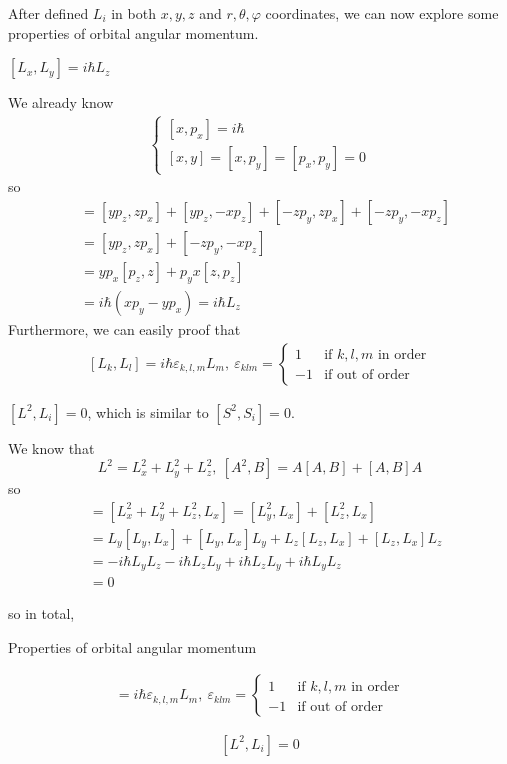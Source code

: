 \documentclass[UTF8,12pt]{article} %
\makeatletter
\newenvironment{proof}[1][\protect\proofname]{\par
\normalfont\topsep6\p@\@plus6\p@\relax
\trivlist
\itemindent\parindent
\item[\hskip\labelsep
\scshape
#1]\ignorespaces
}{%
\endtrivlist\@endpefalse
}
\renewcommand{\proofname}{\it{Solution}}
\makeatother
\begin{document}
After defined $L_{i}$ in both $x,y,z$ and $r,\theta, \varphi$ coordinates, we can now explore some properties of orbital angular momentum.
\begin{enumerate*}
\item $[L_{x}, L_{y}] = i\hbar L_{z}$
\begin{proof}[Proof]
We already know
\begin{align}
\begin{cases}
[x, p_{x}] = i\hbar \\
[x,y] = [x,p_{y}] = [p_{x}, p_{y}] = 0
\end{cases}
\end{align}
so
\begin{align}
[yp_{z} - zp_{y}, zp_{x} - xp_{z}] &= [yp_{z}, zp_{x}] + [yp_{z}, -xp_{z}] + [-zp_{y}, zp_{x}] + [-zp_{y}, -xp_{z}] \\
&= [yp_{z}, zp_{x}] + [-zp_{y}, -xp_{z}] \\
&= yp_{x}[p_{z},z] + p_{y}x[z,p_{z}] \\
&= i\hbar\left(xp_{y} - yp_{x}\right) = i\hbar L_{z}
\end{align}
\end{proof}
Furthermore, we can easily proof that 
\begin{align}
\boxed{[L_{k}, L_{l}] = i\hbar\varepsilon_{k,l,m}L_{m},~ \varepsilon_{klm} = \begin{cases}1&\text{if }k,l,m\text{ in order}\\-1&\text{if out of order}\end{cases}}
\end{align}
\item $\boxed{[L^{2}, L_{i}] = 0}$, which is similar to $[S^{2}, S_{i}] = 0$.
\begin{proof}[Proof]
We know that
$$L^{2} = L_{x}^{2} + L_{y}^{2} + L_{z}^{2},~ [A^{2},B] = A[A,B] + [A,B]A$$
so
\begin{align}
[L^{2}, L_{x}] &= [L_{x}^{2} + L_{y}^{2} + L_{z}^{2}, L_{x}] = [L_{y}^{2}, L_{x}] + [L_{z}^{2}, L_{x}] \\
&= L_{y}[L_{y}, L_{x}] + [L_{y}, L_{x}]L_{y} + L_{z}[L_{z}, L_{x}] + [L_{z}, L_{x}]L_{z} \\
&= -i\hbar L_{y}L_{z} -i\hbar L_{z}L_{y} + i\hbar L_{z}L_{y} + i\hbar L_{y}L_{z} \\
&= 0
\end{align}
\end{proof}
\end{enumerate*}
so in total,
\begin{myboxes}{Properties of orbital angular momentum}{}
\begin{enumerate*}
\item \begin{align*}
[L_{k}, L_{l}] = i\hbar\varepsilon_{k,l,m}L_{m},~ \varepsilon_{klm} = \begin{cases}1&\text{if }k,l,m\text{ in order}\\-1&\text{if out of order}\end{cases}
\end{align*}
\item $$[L^{2}, L_{i}] = 0$$
\end{enumerate*}
\end{myboxes}
\end{document}
